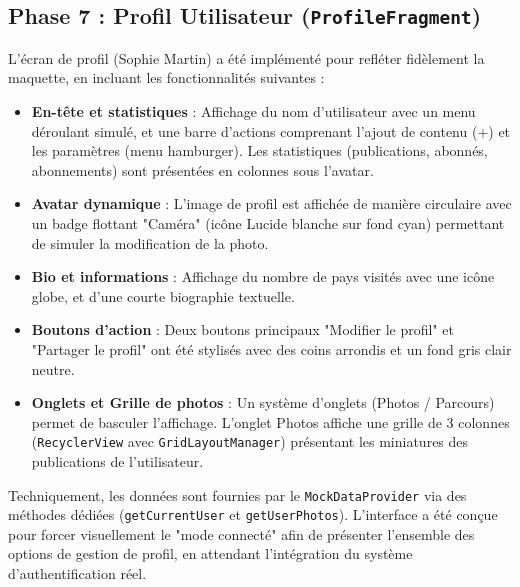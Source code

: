 \documentclass{article}
\begin{document}
\subsection{Phase 7 : Profil Utilisateur (\texttt{ProfileFragment})}
L'écran de profil (Sophie Martin) a été implémenté pour refléter fidèlement la maquette, en incluant les fonctionnalités suivantes :
\begin{itemize}
    \item \textbf{En-tête et statistiques} : Affichage du nom d'utilisateur avec un menu déroulant simulé, et une barre d'actions comprenant l'ajout de contenu (+) et les paramètres (menu hamburger). Les statistiques (publications, abonnés, abonnements) sont présentées en colonnes sous l'avatar.
    \item \textbf{Avatar dynamique} : L'image de profil est affichée de manière circulaire avec un badge flottant "Caméra" (icône Lucide blanche sur fond cyan) permettant de simuler la modification de la photo.
    \item \textbf{Bio et informations} : Affichage du nombre de pays visités avec une icône globe, et d'une courte biographie textuelle.
    \item \textbf{Boutons d'action} : Deux boutons principaux "Modifier le profil" et "Partager le profil" ont été stylisés avec des coins arrondis et un fond gris clair neutre.
    \item \textbf{Onglets et Grille de photos} : Un système d'onglets (Photos / Parcours) permet de basculer l'affichage. L'onglet Photos affiche une grille de 3 colonnes (\texttt{RecyclerView} avec \texttt{GridLayoutManager}) présentant les miniatures des publications de l'utilisateur.
\end{itemize}
Techniquement, les données sont fournies par le \texttt{MockDataProvider} via des méthodes dédiées (\texttt{getCurrentUser} et \texttt{getUserPhotos}). L'interface a été conçue pour forcer visuellement le "mode connecté" afin de présenter l'ensemble des options de gestion de profil, en attendant l'intégration du système d'authentification réel.
\end{document}
